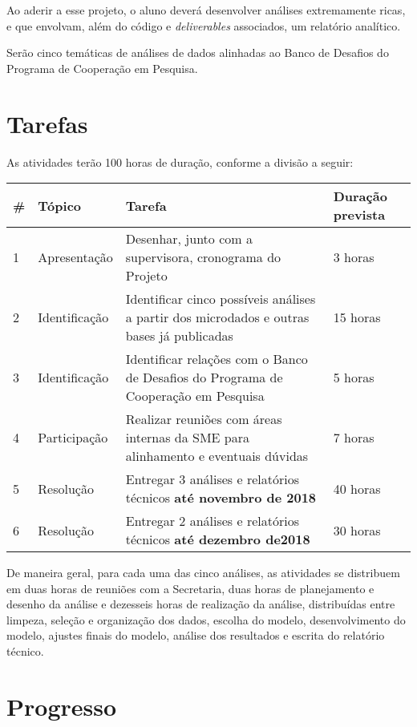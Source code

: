 \documentclass{article}
\begin{document}
Ao aderir a esse projeto, o aluno deverá desenvolver análises extremamente ricas, e que envolvam, além do código e \textit{deliverables} associados, um relatório analítico. 

Serão cinco temáticas de análises de dados alinhadas ao Banco de Desafios do Programa de Cooperação em Pesquisa.


\section{Tarefas}

As atividades terão 100 horas de duração, conforme a divisão a seguir:

\begin{center}
  \begin{tabular}{ | l | l | p{5cm} | l | }
    \hline
    \# & Tópico & Tarefa & Duração prevista \\ \hline
    1 & Apresentação & Desenhar, junto com a supervisora, cronograma do Projeto  & 3 horas \\ \hline
    2 & Identificação & Identificar cinco possíveis análises a partir dos microdados e outras bases já publicadas & 15 horas \\ \hline
    3 & Identificação & Identificar relações com o Banco de Desafios do Programa de Cooperação em Pesquisa & 5 horas \\ \hline
    4 & Participação & Realizar reuniões com áreas internas da SME para alinhamento e eventuais dúvidas & 7 horas \\ \hline
    5 & Resolução & Entregar 3 análises e relatórios técnicos \textbf{até novembro de 2018} & 40 horas  \\ \hline
    6 & Resolução & Entregar 2 análises e relatórios técnicos \textbf{até dezembro de2018} & 30 horas \\ \hline
 \end{tabular}
\end{center}

De maneira geral, para cada uma das cinco análises, as atividades se distribuem em duas horas de reuniões com a Secretaria, duas horas de planejamento e desenho da análise e dezesseis horas de realização da análise, distribuídas entre limpeza, seleção e organização dos dados, escolha do modelo, desenvolvimento do modelo, ajustes finais do modelo, análise dos resultados e escrita do relatório técnico. 

\section{Progresso}
\end{document}

